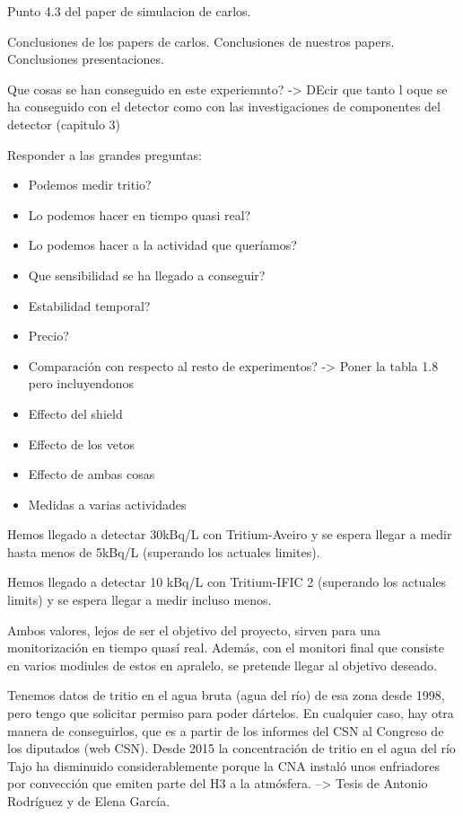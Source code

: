 Punto 4.3 del paper de simulacion de carlos.

Conclusiones de los papers de carlos.
Conclusiones de nuestros papers.
Conclusiones presentaciones.

Que cosas se han conseguido en este experiemnto? -> DEcir que tanto l oque se ha conseguido con el detector como con las investigaciones de componentes del detector (capitulo 3)

Responder a las grandes preguntas: 
\begin{itemize}
\item{} Podemos medir tritio? 
\item{} Lo podemos hacer en tiempo quasi real? 
\item{}Lo podemos hacer a la actividad que queríamos? 
\item{} Que sensibilidad se ha llegado a conseguir?
\item{} Estabilidad temporal?
\item{} Precio?
\item{} Comparación con respecto al resto de experimentos? -> Poner la tabla 1.8 pero incluyendonos
\item{} Effecto del shield
\item{} Effecto de los vetos
\item{} Effecto de ambas cosas
\item{} Medidas a varias actividades
\end{itemize}


Hemos llegado a detectar 30kBq/L con Tritium-Aveiro y se espera llegar a medir hasta menos de 5kBq/L (superando los actuales limites).

Hemos llegado a detectar 10 kBq/L con Tritium-IFIC 2 (superando los actuales limits) y se espera llegar a medir incluso menos.

Ambos valores, lejos de ser el objetivo del proyecto, sirven para una monitorización en tiempo quasí real. Además, con el monitori final que consiste en varios modiules de estos en apralelo, se pretende llegar al objetivo deseado.


Tenemos datos de tritio en el agua bruta (agua del río) de esa zona desde 1998, pero tengo que solicitar permiso para poder dártelos. En cualquier caso, hay otra manera de conseguirlos, que es a partir  de los informes del CSN al Congreso de los diputados (web CSN).
Desde 2015 la concentración de tritio en el agua del río Tajo ha disminuido considerablemente porque la CNA instaló unos enfriadores por convección que emiten parte del H3 a la atmósfera. --> Tesis de Antonio Rodríguez y de Elena García.

